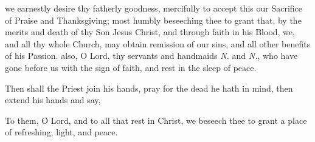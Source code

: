 \par
{}
 we earnestly desire thy fatherly goodness, mercifully to accept this our Sacrifice of Praise and Thanksgiving; most humbly beseeching thee to grant that, by the merits and death of thy Son Jesus Christ, and through faith in his Blood, we, and all thy whole Church, may obtain remission of our sins, and all other benefits of his Passion.
 also, O Lord, thy servants and handmaids \emph{N.} and \emph{N.}, who have gone before us with the sign of faith, and rest in the sleep of peace.
\begin{rubric}
    Then shall the Priest join his hands, pray for the dead he hath in mind, then extend his hands and say,
\end{rubric}\par\noindent
To them, O Lord, and to all that rest in Christ, we beseech thee to grant a place of refreshing, light, and peace.
